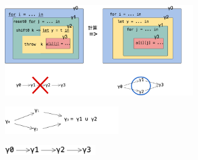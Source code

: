 \begin{center}
  \includegraphics[clip,height=4cm]{./img/ecex_for.png}
\end{center}

\begin{center}
  \includegraphics[clip,width=5cm]{./img/gamma.png}
\end{center}

\begin{center}
  \includegraphics[clip,width=4cm]{./img/gamma_normal.png}
\end{center}


